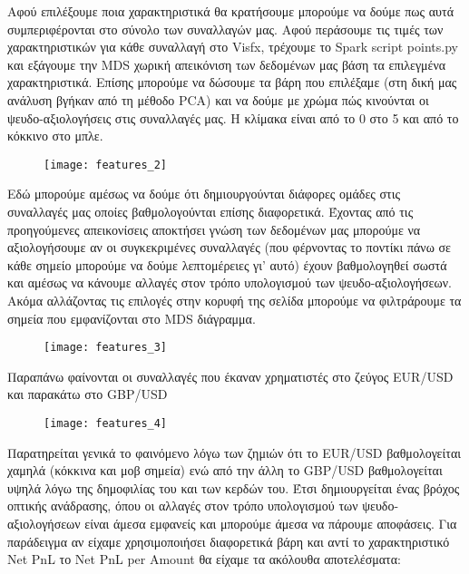 Αφού επιλέξουμε ποια χαρακτηριστικά θα κρατήσουμε μπορούμε να δούμε πως αυτά συμπεριφέρονται στο σύνολο των συναλλαγών μας. Αφού περάσουμε τις τιμές των χαρακτηριστικών για κάθε συναλλαγή στο Visfx, τρέχουμε το Spark script points.py και εξάγουμε την MDS χωρική απεικόνιση των δεδομένων μας βάση τα επιλεγμένα χαρακτηριστικά. Επίσης μπορούμε να δώσουμε τα βάρη που επιλέξαμε (στη δική μας ανάλυση βγήκαν από τη μέθοδο PCA) και να δούμε με χρώμα πώς κινούνται οι ψευδο-αξιολογήσεις στις συναλλαγές μας. Η κλίμακα είναι από το 0 στο 5 και από το κόκκινο στο μπλε.

\begin{figure}[H]
  \centering
  \texttt{[image: features\_2]}
  \label{fig:features_2}
\end{figure}

Εδώ μπορούμε αμέσως να δούμε ότι δημιουργούνται διάφορες ομάδες στις συναλλαγές μας οποίες βαθμολογούνται επίσης διαφορετικά. Έχοντας από τις προηγούμενες απεικονίσεις αποκτήσει γνώση των δεδομένων μας μπορούμε να αξιολογήσουμε αν οι συγκεκριμένες συναλλαγές (που φέρνοντας το ποντίκι πάνω σε κάθε σημείο μπορούμε να δούμε λεπτομέρειες γι’ αυτό) έχουν βαθμολογηθεί σωστά και αμέσως να κάνουμε αλλαγές στον τρόπο υπολογισμού των ψευδο-αξιολογήσεων. Ακόμα αλλάζοντας τις επιλογές στην κορυφή της σελίδα μπορούμε να φιλτράρουμε τα σημεία που εμφανίζονται στο MDS διάγραμμα. 

\begin{figure}[H]
  \centering
  \texttt{[image: features\_3]}
  \label{fig:features_3}
\end{figure}

Παραπάνω φαίνονται οι συναλλαγές που έκαναν χρηματιστές στο ζεύγος EUR/USD και παρακάτω στο GBP/USD

\begin{figure}[H]
  \centering
  \texttt{[image: features\_4]}
  \label{fig:features_4}
\end{figure}

Παρατηρείται γενικά το φαινόμενο λόγω των ζημιών ότι το EUR/USD βαθμολογείται χαμηλά (κόκκινα και μοβ σημεία) ενώ από την άλλη το GBP/USD βαθμολογείται υψηλά λόγω της δημοφιλίας του και των κερδών του. Έτσι δημιουργείται ένας βρόχος οπτικής ανάδρασης, όπου οι αλλαγές στον τρόπο υπολογισμού των ψευδο-αξιολογήσεων είναι άμεσα εμφανείς και μπορούμε άμεσα να πάρουμε αποφάσεις. Για παράδειγμα αν είχαμε χρησιμοποιήσει διαφορετικά βάρη και αντί το χαρακτηριστικό Net PnL το Net PnL per Amount θα είχαμε τα ακόλουθα αποτελέσματα:

